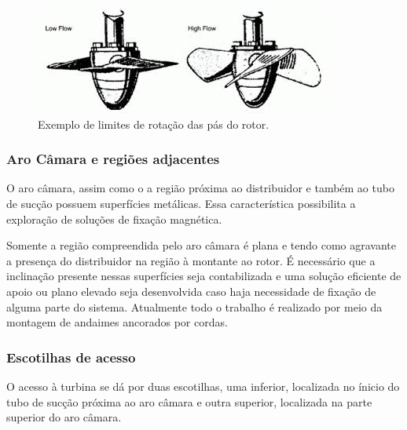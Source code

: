 \begin{figure}[h!]	
	\includegraphics[width=\columnwidth]{sota/figs/intro/blades_angle}
	\caption{Exemplo de limites de rotação das pás do rotor.}
	\label{fig::blades_angle}
\end{figure}

\subsubsection{Aro Câmara e regiões adjacentes}

O aro câmara, assim como o a região próxima ao distribuidor e também ao tubo de
sucção possuem superfícies metálicas. Essa característica possibilita a
exploração de soluções de fixação magnética.

Somente a região compreendida pelo aro câmara é plana e tendo como agravante a presença do distribuidor na região à 
montante ao rotor. É necessário que a inclinação presente nessas superfícies seja contabilizada e uma solução eficiente 
de apoio ou plano elevado seja desenvolvida caso haja necessidade de fixação de alguma parte do sistema. Atualmente todo 
o trabalho é realizado por meio da montagem de andaimes ancorados por cordas. %


 
\subsubsection{Escotilhas de acesso}
O acesso à turbina se dá por duas escotilhas, uma inferior, localizada no ínicio do tubo de sucção 
próxima ao aro câmara e outra superior, localizada na parte superior do aro câmara.

